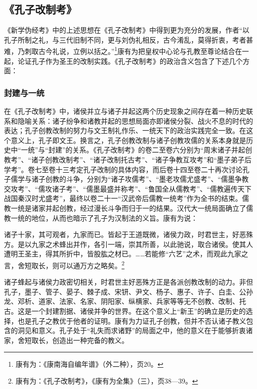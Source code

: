 \documentclass[a4paper, 12pt, openright]{ctexbook}
\renewenvironment{quote}
  {\list{}{\rightmargin2\ccwd \leftmargin2\ccwd \itemindent=2\ccwd \listparindent=2\ccwd}%
   \item\relax\small\kaishu\color{black}}
  {\endlist}
\begin{document}
\subsection{《孔子改制考》}

《新学伪经考》中的上述思想在《孔子改制考》中得到更为充分的发展，作者“以孔子所制之礼，与三代旧制不同，更与刘伪礼相反，古今淆乱，莫得折衷，考者甚难，乃刺取古今礼说，立例以括之。”\footnote{康有为：《康南海自编年谱》（外二种），页20。}康有为把皇权中心论与孔教至尊论结合在一起，论证孔子作为圣王的改制实践。《孔子改制考》的政治含义包含了下述几个方面：

\subsubsection{封建与一统}

在《孔子改制考》中，诸侯并立与诸子并起这两个历史现象之间存在着一种历史联系和隐喻关系：诸子纷争和诸教并起的思想局面亦即诸侯分裂、战火不息的时代的表达；孔子创教改制的努力与文王制礼作乐、一统天下的政治实践完全一致。在这个意义上，孔子即文王。换言之，孔子创教改制与诸子创教攻儒的关系本身就是历史中“一统”与“封建”的关系。《孔子改制考》的卷二至卷六分别为“周末诸子并起创教考”、“诸子创教改制考”、“诸子改制托古考”、“诸子争教互攻考”和“墨子弟子后学考”。卷七至卷十三考定孔子改制的具体内容，而后卷十四至卷二十再次讨论孔子儒学与诸子创教的斗争，分别为“诸子攻儒考”、“墨老攻儒尤盛考”、“儒墨争教交攻考”、“儒攻诸子考”、“儒墨最盛并称考”、“鲁国全从儒教考”、“儒教遍传天下战国秦汉时尤盛考”，最终以卷二十一“汉武帝后儒教一统考”作为全书的结束。儒教一统是诸家并起创教，经过漫长斗争而归于一的结果。汉代大一统局面确立了儒教一统的地位，从而也暗示了孔子为汉制法的义旨。康有为说：

\begin{quote}
诸子十家，其可观者，九家而已。皆起于王道既微，诸侯力政，时君世主，好恶殊方。是以九家之术蜂出并作，各引一端，崇其所善，以此驰说，取合诸侯。使其人遭明王圣主，得其所折中，皆股肱之材已。……若能修“六艺”之术，而观此九家之言，舍短取长，则可以通万方之略矣。\footnote{康有为：《孔子改制考》，《康有为全集》（三），页38—39。}
\end{quote}

诸子蜂起与诸侯力政密切相关，时君世主好恶殊方正是各派创教改制的动力。非但孔子，墨子、管子、晏子、棘子成、宋钘、尹文、杨子、惠子、许子、白圭、公孙龙、邓析、道家、法家、名家、阴阳家、纵横家、兵家等等无不创教、改制、托古。这是一个封建割据、诸侯并争的世界。在这个意义上“新王”的确立是历史的选择，也是孔子之教优于他者的证明。康有为力证孔子创教，但并不否认诸子教义包含的洞见和意义。孔子处于“礼失而求诸野”的局面之中，他的意义在于能够折衷诸家，舍短取长，创造出一种完备的教义。
\end{document}

